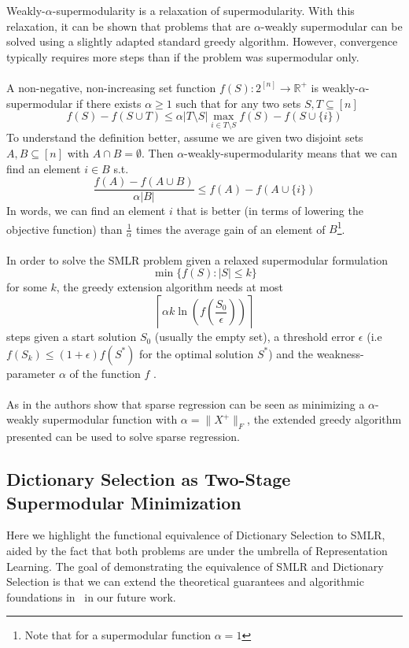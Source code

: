 \documentclass{article}
\begin{document}
Weakly-$\alpha$-supermodularity is a relaxation of supermodularity. With this relaxation, it can be shown that problems that are $\alpha$-weakly supermodular can be solved using a slightly adapted standard greedy algorithm. However, convergence typically requires more steps than  if the problem was supermodular only.
\\
\\
A non-negative, non-increasing set function $f(S): 2^{[n]} \rightarrow \mathbb{R}^+$ is weakly-$\alpha$-supermodular if there exists $\alpha \geq 1$ such that for any two sets $S, T \subseteq [n]$
\[f(S) - f(S \cup T) \leq \alpha \vert T \setminus S\vert \max_{i \in T \setminus S} f(S) - f(S \cup \lbrace i \rbrace) \]
To understand the definition better, assume we are given two disjoint sets $A, B \subseteq [n]$ with $A \cap B = \emptyset$. Then $\alpha$-weakly-supermodularity means that we can find an element $i \in B$ s.t. 
\[
\frac{f(A) - f(A \cup B)}{\alpha \vert B\vert} \leq f(A) - f(A \cup \lbrace i \rbrace)
\]
In words, we can find an element $i$ that is better (in terms of lowering the objective function) than $\frac{1}{\alpha}$ times the average gain of an element of $B$\footnote{Note that for a supermodular function $\alpha = 1$}.
\\
\\
In order to solve the SMLR problem given a relaxed supermodular formulation
\[\min \lbrace f(S) : \vert S \vert \leq k \rbrace \]
for some $k$, the greedy extension algorithm needs at most 
\[ \left\lceil \alpha k \ln \left(f\left(\frac{S_0}{\epsilon}\right)\right)\right\rceil \]
 steps given a start solution $S_0$ (usually the empty set), a threshold error $\epsilon$ (i.e $f(S_k) \leq (1+\epsilon)f(S^*)$ for the optimal solution $S^*$) and the weakness-parameter $\alpha$ of the function $f$ \cite{weaklyalpha}.
 \\
 \\
As in \cite{weaklyalpha} the authors show that sparse regression can be seen as minimizing a $\alpha$-weakly supermodular function with $\alpha = \| X^+ \|_F$, the extended greedy algorithm presented can be used to solve sparse regression.

\subsection{Dictionary Selection as Two-Stage Supermodular Minimization} \label{supermodTwoStage}

Here we highlight the functional equivalence of Dictionary Selection to SMLR, aided by the fact that both problems are under the umbrella of Representation Learning. The goal of demonstrating the equivalence of SMLR and Dictionary Selection is that we can extend the theoretical guarantees and algorithmic foundations in~\cite{weaklyalpha} in our future work. \\
\end{document}
